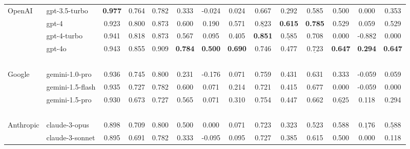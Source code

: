 \begin{table*}[ht]
\begin{tabular}{l|lccc|ccc|ccc|ccc}
        \hline
        OpenAI  & gpt-3.5-turbo          & \textbf{0.977} & 0.764  & 0.782 & 0.333 & -0.024 & 0.024 & 0.667 & 0.292 & 0.585 & 0.500 & 0.000  & 0.353 \\ %
        ~       & gpt-4                  & 0.923 & 0.800  & 0.873 & 0.600 & 0.190  & 0.571 & $\underline{0.823}$ & \textbf{0.615} & \textbf{0.785} & 0.529 & 0.059  & 0.529  \\ %
        ~       & gpt-4-turbo            & 0.941 & 0.818  & 0.873 & 0.567 & 0.095  & 0.405 & \textbf{0.851} & $\underline{0.585}$ & 0.708 & 0.000 & -0.882 & 0.000  \\ %
        ~       & gpt-4o                 & 0.943 & 0.855  & 0.909 & \textbf{0.784} & \textbf{0.500}  & \textbf{0.690} & 0.746 & 0.477 & $\underline{0.723}$ & \textbf{0.647} & \textbf{0.294}  & \textbf{0.647}  \\ %
        ~       & ~                      & ~ & ~ & ~ & ~  & ~ & ~ & ~ & ~ & ~ & ~  & ~ & ~ \\
        Google  & gemini-1.0-pro         & 0.936 & 0.745  & 0.800 & 0.231 & -0.176 & 0.071 & 0.759 & 0.431 & 0.631 & 0.333 & -0.059 & 0.059\\ %
        ~       & gemini-1.5-flash       & 0.935 & 0.727  & 0.782 & 0.600 & 0.071  & 0.214 & 0.721 & 0.415 & 0.677 & 0.000 & -0.059 & 0.000\\ %
        ~       & gemini-1.5-pro         & 0.930 & 0.673  & 0.727 & 0.565 & 0.071  & 0.310 & 0.754 & 0.447 & 0.662 & $\underline{0.625}$ & 0.118  & 0.294\\ %
        ~       & ~                      & ~ & ~ & ~ & ~  & ~ & ~ & ~ & ~ & ~ & ~  & ~ & ~ \\
        Anthropic & claude-3-opus        & 0.898 & 0.709  & 0.800 & 0.500 & 0.000  & 0.071 & 0.723 & 0.323 & 0.523 & 0.588 & $\underline{0.176}$  & $\underline{0.588}$\\ %
        ~       & claude-3-sonnet        & 0.895 & 0.691  & 0.782 & 0.333 & -0.095 & 0.095 & 0.727 & 0.385 & 0.615 & 0.500 & 0.000  & 0.118\\ %

\end{tabular}
\end{table*}
